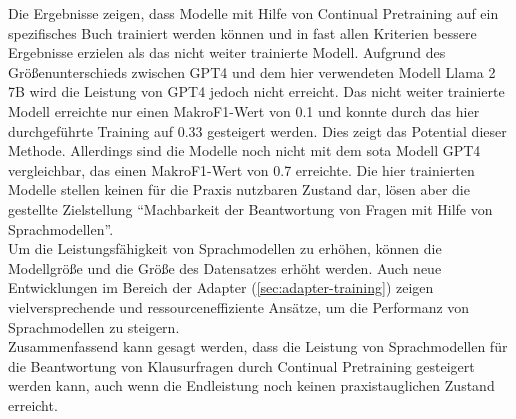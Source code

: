 Die Ergebnisse zeigen, dass Modelle mit Hilfe von Continual Pretraining auf ein spezifisches Buch trainiert werden können und in fast allen Kriterien bessere Ergebnisse erzielen als das nicht weiter trainierte Modell.
Aufgrund des Größenunterschieds zwischen GPT4 und dem hier verwendeten Modell Llama 2 7B wird die Leistung von GPT4 jedoch nicht erreicht.
Das nicht weiter trainierte Modell erreichte nur einen MakroF1-Wert von \num{0.1} und konnte durch das hier durchgeführte Training auf \num{0.33} gesteigert werden.
Dies zeigt das Potential dieser Methode.
Allerdings sind die Modelle noch nicht mit dem \ac{sota} Modell GPT4 vergleichbar, das einen MakroF1-Wert von \num{0.7} erreichte.
Die hier trainierten Modelle stellen keinen für die Praxis nutzbaren Zustand dar, lösen aber die gestellte Zielstellung \enquote{Machbarkeit der Beantwortung von Fragen mit Hilfe von Sprachmodellen}.\\

Um die Leistungsfähigkeit von Sprachmodellen zu erhöhen, können die Modellgröße und die Größe des Datensatzes erhöht werden.
Auch neue Entwicklungen im Bereich der Adapter (\cref{sec:adapter-training}) zeigen vielversprechende und ressourceneffiziente Ansätze, um die Performanz von Sprachmodellen zu steigern.\\

Zusammenfassend kann gesagt werden, dass die Leistung von Sprachmodellen für die Beantwortung von Klausurfragen durch Continual Pretraining gesteigert werden kann, auch wenn die Endleistung noch keinen praxistauglichen Zustand erreicht.\\

\vfill
